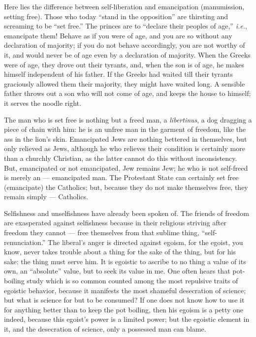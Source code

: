 Here lies the difference between self-liberation and emancipation 
(manumission, setting free). Those who today ``stand in the opposition'' are 
thirsting and screaming to be ``set free.'' The princes are to ``declare 
their peoples of age,'' \textit{i.e.}, emancipate them! Behave as if you 
were of age, and you are so without any declaration of majority; if you do not 
behave accordingly, you are not worthy of it, and would never be of age even 
by a declaration of majority. When the Greeks were of age, they drove out 
their tyrants, and, when the son is of age, he makes himself independent of 
his father. If the Greeks had waited till their tyrants graciously allowed 
them their majority, they might have waited long. A sensible father throws out 
a son who will not come of age, and keeps the house to himself; it serves the 
noodle right.

The man who is set free is nothing but a freed man, a \textit{libertinus}, a 
dog dragging a piece of chain with him: he is an unfree man in the garment of 
freedom, like the ass in the lion's skin. Emancipated Jews are nothing 
bettered in themselves, but only relieved as Jews, although he who relieves 
their condition is certainly more than a churchly Christian, as the latter 
cannot do this without inconsistency. But, emancipated or not emancipated, Jew 
remains Jew; he who is not self-freed is merely an --- emancipated man. The 
Protestant State can certainly set free (emancipate) the Catholics; but, 
because they do not make themselves free, they remain simply --- Catholics.

Selfishness and unselfishness have already been spoken of. The friends of 
freedom are exasperated against selfishness because in their religious 
striving after freedom they cannot --- free themselves from that sublime thing, 
``self-renunciation.'' The liberal's anger is directed against egoism, for 
the egoist, you know, never takes trouble about a thing for the sake of the 
thing, but for his sake: the thing must serve him. It is egoistic to ascribe 
to no thing a value of its own, an ``absolute'' value, but to seek its value 
in me. One often hears that pot-boiling study which is so common counted among 
the most repulsive traits of egoistic behavior, because it manifests the most 
shameful desecration of science; but what is science for but to be consumed? 
If one does not know how to use it for anything better than to keep the pot 
boiling, then his egoism is a petty one indeed, because this egoist's power is 
a limited power; but the egoistic element in it, and the desecration of 
science, only a possessed man can blame.

